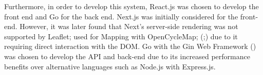 Furthermore, in order to develop this system, React.js was chosen to develop the front end and Go for the back end. Next.js was initially considered for the front-end. However, it was later found that Next's server-side rendering was not supported by Leaflet; used for Mapping with OpenCycleMap; (\cite{noauthor_leaflet_nodate};\cite{noauthor_opencyclemaporg_nodate}) due to it requiring direct interaction with the DOM. Go with the Gin Web Framework (\cite{noauthor_gin_nodate}) was chosen to develop the API and back-end due to its increased performance benefits over alternative languages such as Node.js with Express.js.
